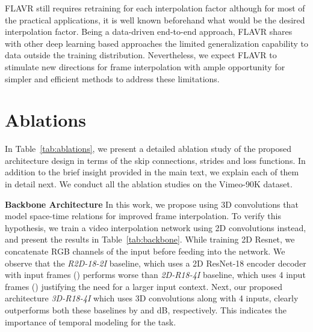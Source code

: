\documentclass[10pt,twocolumn,letterpaper]{article}
\newcommand{\tabref}[1]{Table~\ref{#1}}
\newcommand{\Ours}{FLAVR}
\begin{document}
\begin{table*}[!t]
\Ours{} still requires retraining for each interpolation factor  although for most of the practical applications, it is well known beforehand what would be the desired interpolation factor. Being a data-driven end-to-end approach, \Ours{} shares with other deep learning based approaches the limited generalization capability to data outside the training distribution. Nevertheless, we expect \Ours{} to stimulate new directions for frame interpolation with ample opportunity for simpler and efficient methods to address these limitations.



\section{ Ablations}

In \tabref{tab:ablations}, we present a detailed ablation study of the proposed architecture design in terms of the skip connections, strides and loss functions. In addition to the brief insight provided in the main text, we explain each of them in detail next. We conduct all the ablation studies on the Vimeo-90K dataset.

{\bf Backbone Architecture} In this work, we propose using 3D convolutions that model space-time relations for improved frame interpolation. To verify this hypothesis, we train a video interpolation network using 2D convolutions instead, and present the results in \tabref{tab:backbone}. While training 2D Resnet, we concatenate RGB channels of the input before feeding into the network. We observe that the \textit{R2D-18-2I} baseline, which uses a 2D ResNet-18 encoder decoder with  input frames () performs worse than \textit{2D-R18-4I} baseline, which uses 4 input frames () justifying the need for a larger input context. Next, our proposed architecture \textit{3D-R18-4I} which uses 3D convolutions along with 4 inputs, clearly outperforms both these baselines by  and dB, respectively. This indicates the importance of temporal modeling for the task. 


\end{table*}
\end{document}
